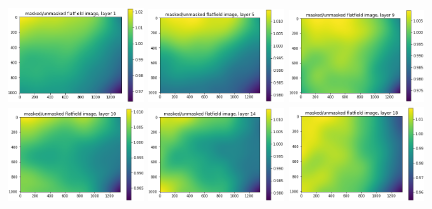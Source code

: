 \documentclass[letterpaper,11pt]{article}
\begin{document}
\begin{figure}[!ht]
\centering
\includegraphics[width=0.32\textwidth]{images/results/masked_over_unmasked_flatfield_image_layers_vectra/masked_over_unmasked_flatfield_image_layer_1}
\includegraphics[width=0.32\textwidth]{images/results/masked_over_unmasked_flatfield_image_layers_vectra/masked_over_unmasked_flatfield_image_layer_5}
\includegraphics[width=0.32\textwidth]{images/results/masked_over_unmasked_flatfield_image_layers_vectra/masked_over_unmasked_flatfield_image_layer_9}
\includegraphics[width=0.32\textwidth]{images/results/masked_over_unmasked_flatfield_image_layers_vectra/masked_over_unmasked_flatfield_image_layer_10}
\includegraphics[width=0.32\textwidth]{images/results/masked_over_unmasked_flatfield_image_layers_vectra/masked_over_unmasked_flatfield_image_layer_14}
\includegraphics[width=0.32\textwidth]{images/results/masked_over_unmasked_flatfield_image_layers_vectra/masked_over_unmasked_flatfield_image_layer_18}

\end{figure}
\end{document}
